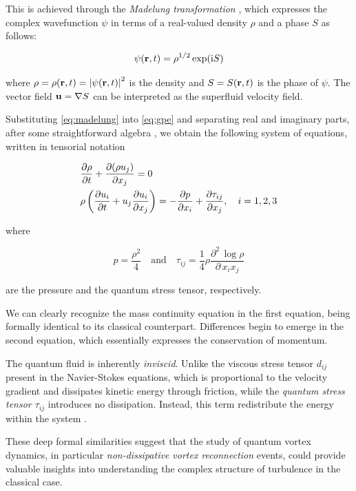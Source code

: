 \medskip

This is achieved through the \emph{Madelung transformation} \cite{madelung1927quantentheorie}, which expresses the complex wavefunction $\psi$ in terms of a real-valued density $\rho$ and a phase $S$ as follows:

\begin{equation}
    \psi(\mathbf{r}, t) = \rho^{1/2}\exp(\mathrm{i} S)
    \label{eq:madelung}
\end{equation}

where $\rho = \rho(\mathbf{r}, t) = \left| \psi(\mathbf{r}, t) \right|^2$ is the density and $S = S(\mathbf{r}, t)$ is the phase of $\psi$. The vector field $\mathbf{u} = \mathbf{\nabla} S$ can be interpreted as the superfluid velocity field.

\medskip

Substituting \eqref{eq:madelung} into \eqref{eq:gpe} and separating real and imaginary parts, after some straightforward algebra \cite{CZ12}, we obtain the following system of equations, written in tensorial notation

\begin{align*}
    &\frac{\partial \rho}{\partial t} + \frac{\partial (\rho u_j)}{\partial x_j} = 0 \\
    &\rho \left(\frac{\partial u_i}{\partial t} + u_j \frac{\partial u_i}{\partial x_j}\right) = -\frac{\partial p}{\partial x_i} + \frac{\partial \tau_{ij}}{\partial x_j}, \quad i = 1,2,3
\end{align*}

where 

\[
    p = \frac{\rho^2}{4} \quad \text{and} \quad \tau_{ij} = \frac14 \rho \frac{\partial^2\,\log \rho}{\partial\,x_i x_j}
\]

are the pressure and the quantum stress tensor, respectively.

We can clearly recognize the mass continuity equation in the first equation, being formally identical to its classical counterpart. Differences begin to emerge in the second equation, which essentially expresses the conservation of momentum.

The quantum fluid is inherently \emph{inviscid}. Unlike the viscous stress tensor $d_{ij}$ \cite{noteZ} present in the Navier-Stokes equations, which is proportional to the velocity gradient and dissipates kinetic energy through friction, while the \emph{quantum stress tensor $\tau_{ij}$} introduces no dissipation. Instead, this term redistribute the energy within the system \cite{Tanogami2021}.

These deep formal similarities suggest that the study of quantum vortex dynamics, in particular \emph{non-dissipative vortex reconnection} events, could provide valuable insights into understanding the complex structure of turbulence in the classical case.

